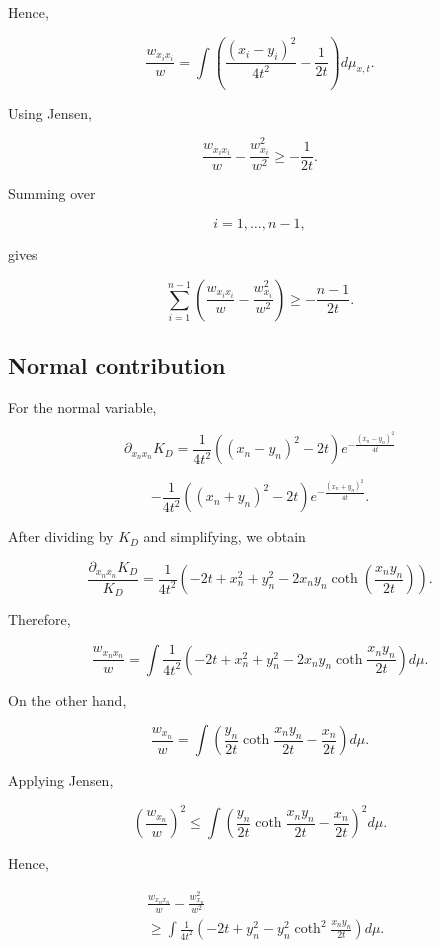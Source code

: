 \documentclass[10pt,a4paper]{amsart}
\begin{document}
Hence,

\[
\frac{w_{x_ix_i}}w
=
\int
\left(
\frac{(x_i-y_i)^2}{4t^2}
-\frac1{2t}
\right)
d\mu_{x,t}.
\]


Using Jensen,

\[
\frac{w_{x_ix_i}}w
-
\frac{w_{x_i}^2}{w^2}
\geq
-\frac1{2t}.
\]


Summing over

\[
i=1,\ldots,n-1,
\]

gives

\[
\sum_{i=1}^{n-1}
\left(
\frac{w_{x_ix_i}}w
-
\frac{w_{x_i}^2}{w^2}
\right)
\geq
-\frac{n-1}{2t}.
\]



\subsection{Normal contribution}


For the normal variable,

\[
\partial_{x_nx_n}K_D
=
\frac1{4t^2}
\left(
(x_n-y_n)^2-\!2t
\right)
e^{-\frac{(x_n-y_n)^2}{4t}}
\]

\[
-
\frac1{4t^2}
\left(
(x_n+y_n)^2-\!2t
\right)
e^{-\frac{(x_n+y_n)^2}{4t}} .
\]


After dividing by $K_D$ and simplifying, we obtain

\[
\frac{\partial_{x_nx_n}K_D}
{K_D}
=
\frac1{4t^2}
\left(
-2t+x_n^2+y_n^2
-
2x_ny_n
\coth
\left(
\frac{x_ny_n}{2t}
\right)
\right).
\]


Therefore,

\[
\frac{w_{x_nx_n}}w
=
\int
\frac1{4t^2}
\left(
-2t+x_n^2+y_n^2
-
2x_ny_n
\coth
\frac{x_ny_n}{2t}
\right)
d\mu .
\]


On the other hand,

\[
\frac{w_{x_n}}w
=
\int
\left(
\frac{y_n}{2t}
\coth
\frac{x_ny_n}{2t}
-
\frac{x_n}{2t}
\right)
d\mu .
\]


Applying Jensen,

\[
\left(\frac{w_{x_n}}w\right)^2
\leq
\int
\left(
\frac{y_n}{2t}
\coth
\frac{x_ny_n}{2t}
-
\frac{x_n}{2t}
\right)^2
d\mu .
\]


Hence,

\[
\begin{aligned}
&
\frac{w_{x_nx_n}}w
-
\frac{w_{x_n}^2}{w^2}
\\
&\geq
\int
\frac1{4t^2}
\left(
-2t
+
y_n^2
-
y_n^2
\coth^2
\frac{x_ny_n}{2t}
\right)
d\mu .
\end{aligned}
\]
\end{document}

